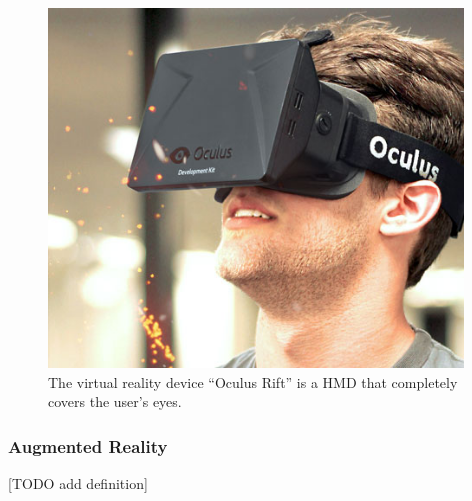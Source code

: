 	\begin{figure}[ht!]
		\centering
		\includegraphics[width=110mm]{images/OculusRift}
		\caption{The virtual reality device ``Oculus Rift'' is a HMD that completely covers the user's eyes.\cite{ImagesOculusRift}}
		\label{OculusRift}
	\end{figure}


\subsubsection{Augmented Reality}
\label{subsubsec:ar}
[TODO add definition]









